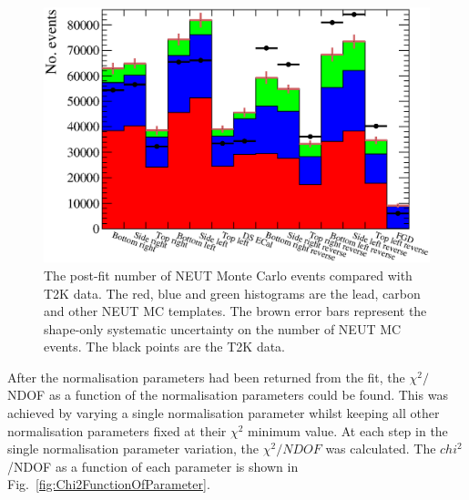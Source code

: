 \begin{figure}
  \centering
  \includegraphics[width=15cm]{images/measurement/data/MCTemplatesWithSystematics_T2KData_PostFit.eps}
  \caption{The post-fit number of NEUT Monte Carlo events compared with T2K data.  The red, blue and green histograms are the lead, carbon and other NEUT MC templates.  The brown error bars represent the shape-only systematic uncertainty on the number of NEUT MC events.  The black points are the T2K data.}
  \label{fig:MCTemplatesWithSystematicsT2KDataPostFit}
\end{figure}
After the normalisation parameters had been returned from the fit, the $\chi^2/$NDOF as a function of the normalisation parameters could be found.  This was achieved by varying a single normalisation parameter whilst keeping all other normalisation parameters fixed at their $\chi^2$ minimum value.  At each step in the single normalisation parameter variation, the $\chi^2/NDOF$ was calculated.  The $chi^2$/NDOF as a function of each parameter is shown in Fig.~\ref{fig:Chi2FunctionOfParameter}.
